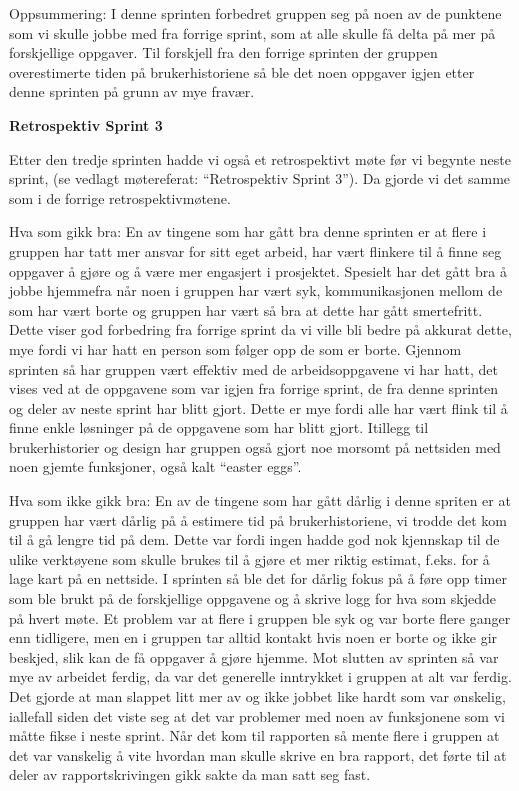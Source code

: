 \documentclass[12pt,a4paper,norsk]{article}
\begin{document}
Oppsummering:
I denne sprinten forbedret gruppen seg på noen av de punktene som vi skulle jobbe med fra forrige sprint, som at alle skulle få delta på mer på forskjellige oppgaver. Til forskjell fra den forrige sprinten der gruppen overestimerte tiden på brukerhistoriene så ble det noen oppgaver igjen etter denne sprinten på grunn av mye fravær. 

\bigskip \noindent \textbf{Retrospektiv Sprint 3}
\par Etter den tredje sprinten hadde vi også et retrospektivt møte før vi begynte neste sprint, (se vedlagt møtereferat: “Retrospektiv Sprint 3”). Da gjorde vi det samme som i de forrige retrospektivmøtene. 

Hva som gikk bra:
En av tingene som har gått bra denne sprinten er at flere i gruppen har tatt mer ansvar for sitt eget arbeid, har vært flinkere til å finne seg oppgaver å gjøre og å være mer engasjert i prosjektet. Spesielt har det gått bra å jobbe hjemmefra når noen i gruppen har vært syk, kommunikasjonen mellom de som har vært borte og gruppen har vært så bra at dette har gått smertefritt. Dette viser god forbedring fra forrige sprint da vi ville bli bedre på akkurat dette, mye fordi vi har hatt en person som følger opp de som er borte. 
Gjennom sprinten så har gruppen vært effektiv med de arbeidsoppgavene vi har hatt, det vises ved at de oppgavene som var igjen fra forrige sprint, de fra denne sprinten og deler av neste sprint har blitt gjort. Dette er mye fordi alle har vært flink til å finne enkle løsninger på de oppgavene som har blitt gjort. 
Itillegg til brukerhistorier og design har gruppen også gjort noe morsomt på nettsiden med noen gjemte funksjoner, også kalt “easter eggs”.  

Hva som ikke gikk bra:
En av de tingene som har gått dårlig i denne spriten er at gruppen har vært dårlig på å estimere tid på brukerhistoriene, vi trodde det kom til å gå lengre tid på dem. Dette var fordi ingen hadde god nok kjennskap til de ulike verktøyene som skulle brukes til å gjøre et mer riktig estimat, f.eks. for å lage kart på en nettside.
I sprinten så ble det for dårlig fokus på å føre opp timer som ble brukt på de forskjellige oppgavene og å skrive logg for hva som skjedde på hvert møte. 
Et problem var at flere i gruppen ble syk og var borte flere ganger enn tidligere, men en i gruppen tar alltid kontakt hvis noen er borte og ikke gir beskjed, slik kan de få oppgaver å gjøre hjemme. 
Mot slutten av sprinten så var mye av arbeidet ferdig, da var det generelle inntrykket i gruppen at alt var ferdig. Det gjorde at man slappet litt mer av og ikke jobbet like hardt som var ønskelig, iallefall siden det viste seg at det var problemer med noen av funksjonene som vi måtte fikse i neste sprint. 
Når det kom til rapporten så mente flere i gruppen at det var vanskelig å vite hvordan man skulle skrive en bra rapport, det førte til at deler av rapportskrivingen gikk sakte da man satt seg fast.
\end{document}
